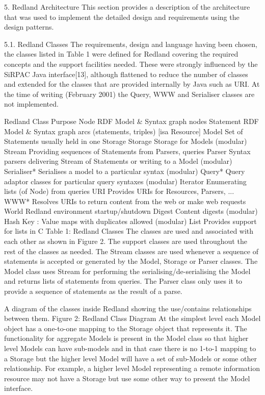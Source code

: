 \documentclass[11pt]{article}
\begin{document}
    5. Redland Architecture
    This section provides a description of the architecture that was used to implement the detailed design and requirements using the design patterns.

    5.1. Redland Classes
    The requirements, design and language having been chosen, the classes listed in Table 1 were defined for Redland covering the required concepts and the support facilities needed. These were strongly influenced by the SiRPAC Java interface[13], although flattened to reduce the number of classes and extended for the classes that are provided internally by Java such as URI. At the time of writing (February 2001) the Query, WWW and Serialiser classes are not implemented.

    Redland Class Purpose
    Node RDF Model & Syntax graph nodes
    Statement RDF Model & Syntax graph arcs (statements, triples) [isa Resource]
    Model Set of Statements usually held in one Storage
    Storage Storage for Models (modular)
    Stream Providing sequences of Statements from Parsers, queries
    Parser Syntax parsers delivering Stream of Statements or writing to a Model (modular)
    Serialiser* Serialises a model to a particular syntax (modular)
    Query* Query adaptor classes for particular query syntaxes (modular)
    Iterator Enumerating lists (of Node) from queries
    URI Provides URIs for Resources, Parsers, ...
    WWW* Resolves URIs to return content from the web or make web requests
    World Redland environment startup/shutdown
    Digest Content digests (modular)
    Hash Key : Value maps with duplicates allowed (modular)
    List Provides support for lists in C
    Table 1: Redland Classes
    The classes are used and associated with each other as shown in Figure 2. The support classes are used throughout the rest of the classes as needed. The Stream classes are used whenever a sequence of statements is accepted or generated by the Model, Storage or Parser classes. The Model class uses Stream for performing the serialising/de-serialising the Model and returns lists of statements from queries. The Parser class only uses it to provide a sequence of statements as the result of a parse.

    A diagram of the classes inside Redland showing the use/contains relationships between them.
    Figure 2: Redland Class Diagram
    At the simplest level each Model object has a one-to-one mapping to the Storage object that represents it. The functionality for aggregate Models is present in the Model class so that higher level Models can have sub-models and in that case there is no 1-to-1 mapping to a Storage but the higher level Model will have a set of sub-Models or some other relationship. For example, a higher level Model representing a remote information resource may not have a Storage but use some other way to present the Model interface.
\end{document}
